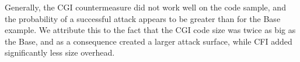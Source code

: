 Generally, the CGI countermeasure did not work well on the code sample, and the probability of a successful attack appears to be greater than for the Base example. We attribute this to the fact that the CGI code size was twice as big as the Base, and as a consequence created a larger attack surface, while CFI added significantly less size overhead.